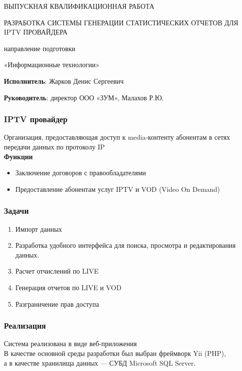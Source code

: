\documentclass{beamer}
\begin{document}
\sloppy

\begin{frame}
\begin{center}
ВЫПУСКНАЯ КВАЛИФИКАЦИОННАЯ РАБОТА

\vspace{0.3cm}
РАЗРАБОТКА СИСТЕМЫ ГЕНЕРАЦИИ СТАТИСТИЧЕСКИХ ОТЧЕТОВ ДЛЯ IPTV ПРОВАЙДЕРА

\vspace{0.3cm}
направление подготовки

«Информационные технологии»
\end{center}

\vspace{0.5cm}
\textbf{Исполнитель}: Жарков Денис Сергеевич

\vspace{0.3cm}
\textbf{Руководитель}: директор ООО «ЗУМ», Малахов Р.Ю.
\end{frame}

\begin{frame}
\frametitle{IPTV провайдер}
Организация, предоставляющая доступ к media-контенту абонентам в сетях передачи данных по протоколу IP
\\
\vspace{0.3cm}
{\bf Функции}
\begin{itemize}
\item{
Заключение договоров с правообладателями
}
\item{
Предоставление абонентам услуг IPTV и VOD (Video On Demand)
}
\end{itemize}
\end{frame}

\begin{frame}
\frametitle{Задачи}
\begin{enumerate}
\item {
Импорт данных
}
\item {
Разработка удобного интерфейса для поиска, просмотра и редактирования данных.
}
\item {
Расчет отчислений по LIVE
}
\item {
Генерация отчетов по LIVE и VOD
}
\item {
Разграничение прав доступа
}
\end{enumerate}
\end{frame}

\begin{frame}
\frametitle{Реализация}

Система реализована в виде веб-приложения\\
В качестве основной среды разработки был выбран фреймворк Yii (PHP),\\
а в качестве хранилища данных --- СУБД Microsoft SQL Server.\\

\end{frame}
\end{document}
